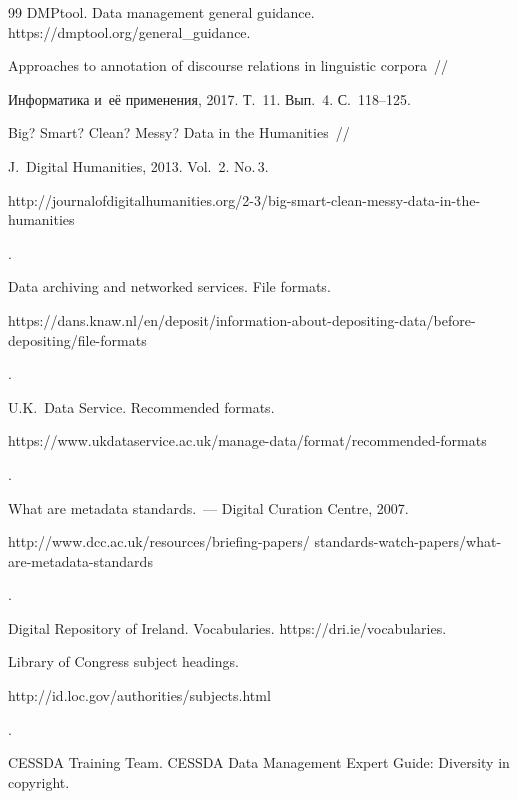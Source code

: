 {{\begin{thebibliography}{99}
DMPtool. Data management general guidance. {\sf https://dmptool.org/general\_\linebreak guidance}. 




 Approaches to annotation of discourse relations in linguistic corpora~/\!\!/ 

Информатика и~её применения, 2017. Т.~11. Вып.~4. С.~118--125.




 Big? Smart? Clean? Messy? Data in the Humanities~/\!\!/ 

J.~Digital Humanities, 2013. Vol.~2. No.\,3. {\sf  

http://journalofdigitalhumanities.org/2-3/big-smart-clean-messy-data-in-the-humanities}. 


Data archiving and networked services. File formats. {\sf 

https://dans.knaw.nl/en/\linebreak deposit/information-about-depositing-data/before-depositing/file-formats}.


U.K.\ Data Service. Recommended formats. {\sf  

https://www.ukdataservice.ac.uk/\linebreak manage-data/format/recommended-formats}.




 What are metadata standards.~--- Digital Curation Centre, 2007. {\sf 

http://www.dcc.ac.uk/resources/briefing-papers/ standards-watch-papers/what-are-metadata-standards}. 


Digital Repository of Ireland. Vocabularies. {\sf https://dri.ie/vocabularies}.


Library of Congress subject headings. {\sf 

http://id.loc.gov/authorities/subjects.html}.


CESSDA Training Team. CESSDA Data Management Expert Guide: Diversity in copyright. 


\end{thebibliography}}}
